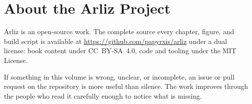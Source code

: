 \chapter*{About the Arliz Project}

Arliz is an open-source work. The complete source every chapter, figure,
and build script is available at \url{https://github.com/papyrxis/arliz}
under a dual license: book content under CC~BY-SA~4.0, code and tooling
under the MIT License.

If something in this volume is wrong, unclear, or incomplete, an issue or
pull request on the repository is more useful than silence. The work
improves through the people who read it carefully enough to notice what
is missing.

\clearpage

